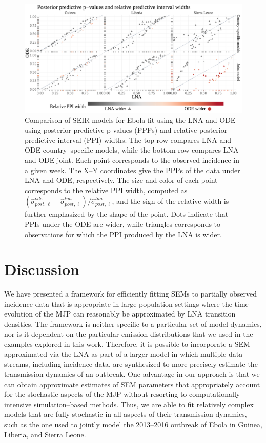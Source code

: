 \begin{figure}[htbp]
	\centering
	\includegraphics[width=0.85\linewidth]{figures/ebola_lna_ode_ppicomp}
	\caption[Comparison of SEIR Ebola models fit via the LNA and ODE with posterior predictive p-values and relative predictive interval widths.]{Comparison of SEIR models for Ebola fit using the LNA and ODE using posterior predictive p-values (PPPs) and relative posterior predictive interval (PPI) widths. The top row compares LNA and ODE country--specific models, while the bottom row compares LNA and ODE joint. Each point corresponds to the observed incidence in a given week. The X--Y coordinates give the PPPs of the data under LNA and ODE, respectively. The size and color of each point corresponds to the relative PPI width, computed as $ (\widehat{\sigma}_{post,\ell}^{ode} - \widehat{\sigma}_{post,\ell}^{lna})/\widehat{\sigma}_{post,\ell}^{lna}$, and the sign of the relative width is further emphasized by the shape of the point. Dots indicate that PPIs under the ODE are wider, while triangles corresponds to observations for which the PPI produced by the LNA is wider.}
	\label{fig:ebola_lna_ode_ppicomp}
\end{figure}

\newpage
\section{Discussion}
\label{sec:lna_discussion}

We have presented a framework for efficiently fitting SEMs to partially observed incidence data that is appropriate in large population settings where the time--evolution of the MJP can reasonably be approximated by LNA transition densities. The framework is neither specific to a particular set of model dynamics, nor is it dependent on the particular emission distributions that we used in the examples explored in this work. Therefore, it is possible to incorporate a SEM approximated via the LNA as part of a larger model in which multiple data streams, including incidence data, are synthesized to more precisely estimate the transmission dynamics of an outbreak. One advantage in our approach is that we can obtain approximate estimates of SEM parameters that appropriately account for the stochastic aspects of the MJP without resorting to computationally intensive simulation--based methods. Thus, we are able to fit relatively complex models that are fully stochastic in all aspects of their transmission dynamics, such as the one used to jointly model the 2013--2016 outbreak of Ebola in Guinea, Liberia, and Sierra Leone. 

